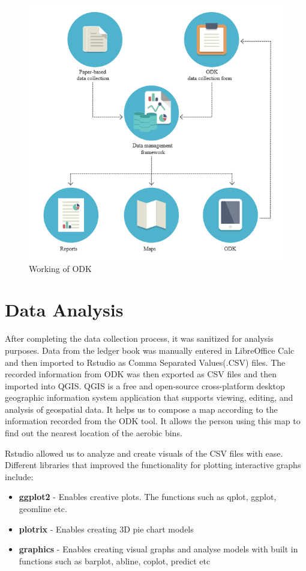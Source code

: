 \documentclass[12pt,a4paper]{report}
\begin{document}
\begin{figure}[H]
	\centering
	\includegraphics[width=0.8\linewidth]{odk_flow}
	\caption{Working of ODK}
	\label{fig:odkflow}
\end{figure}

\chapter{\textbf{Data Analysis}}

After completing the data collection process, it was sanitized for analysis purposes. Data from the ledger book was manually entered in LibreOffice Calc and then imported to Rstudio as Comma Separated Values(.CSV) files. The recorded information from ODK was then exported as CSV files and then imported into QGIS. QGIS is a free and open-source cross-platform desktop geographic information system application that supports viewing, editing, and analysis of geospatial data. It helps us to compose a map according to the information recorded from the ODK tool. It allows the person using this map to find out the nearest location of the aerobic bins.

Rstudio allowed us to analyze and create visuals of the CSV files with ease. Different libraries that improved the functionality for plotting interactive graphs include:

\begin{itemize}
	\item \textbf{ggplot2} - Enables creative plots. The functions such as qplot, ggplot, geomline etc.
	\item \textbf{plotrix} - Enables creating 3D pie chart models
	\item \textbf{graphics} - Enables creating visual graphs and analyse models with built in functions such as barplot, abline, coplot, predict etc
\end{itemize}
\end{document}
